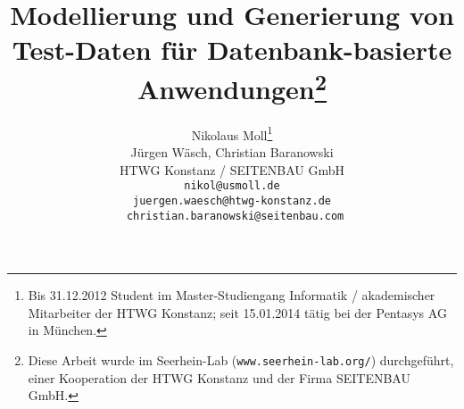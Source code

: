\documentclass{lni}
\author{
	Nikolaus Moll\footnote{Bis 31.12.2012 Student im Master-Studiengang Informatik / akademischer Mitarbeiter der HTWG Konstanz; seit 15.01.2014 tätig bei der Pentasys AG in München.}
\\ Jürgen Wäsch, Christian Baranowski \\ 
	HTWG Konstanz / SEITENBAU GmbH\\ 
           \texttt{nikol@usmoll.de}\\ \texttt{juergen.waesch@htwg-konstanz.de}\\ \texttt{ christian.baranowski@seitenbau.com} 
}
\title{Modellierung und Generierung von Test-Daten für Datenbank-basierte Anwendungen\footnote{Diese Arbeit wurde im Seerhein-Lab (\texttt{www.seerhein-lab.org/}) durchgeführt, einer Kooperation der HTWG Konstanz und der Firma SEITENBAU GmbH.}}
\begin{document}
\maketitle




\begin{abstract}

%

\end{abstract}

\clearpage



\clearpage



\clearpage



\clearpage






\end{document}
